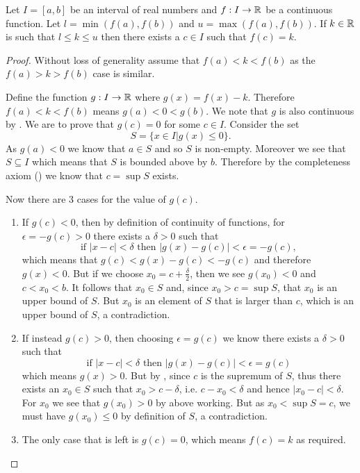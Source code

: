 \begin{theorem}\label{thrm-intermediate-value-theorem}
    Let $I = [a, b]$ be an interval of real numbers and $f: I \to \mathbb{R}$ be a continuous function. Let $l = \min(f(a), f(b))$ and $u = \max(f(a), f(b))$. If $k \in \mathbb{R}$ is such that $l \leq k \leq u$ then there exists a $c \in I$ such that $f(c) = k$.
\end{theorem}
\begin{proof}
    Without loss of generality assume that $f(a) < k < f(b)$ as the $f(a) > k > f(b)$ case is similar.

    Define the function $g: I \to \mathbb{R}$ where $g(x) = f(x) - k$. Therefore $f(a) < k < f(b)$ means $g(a) < 0 < g(b)$. We note that $g$ is also continuous by . We are to prove that $g(c) = 0$ for some $c \in I$. Consider the set
    \[
        S = \{x \in I \vert g(x) \leq 0\}.
    \]
    As $g(a) < 0$ we know that $a \in S$ and so $S$ is non-empty. Moreover we see that $S \subseteq I$ which means that $S$ is bounded above by $b$. Therefore by the completeness axiom () we know that $c = \sup S$ exists.

    Now there are 3 cases for the value of $g(c)$.
    \begin{enumerate}
        \item If $g(c) < 0$, then by definition of continuity of functions, for $\epsilon = -g(c) > 0$ there exists a $\delta > 0$ such that
        \[
            \text{if } |x - c| < \delta \text{ then } |g(x) - g(c)| < \epsilon = -g(c),
        \]
        which means that $g(c) < g(x) - g(c) < -g(c)$ and therefore $g(x) < 0$. But if we choose $x_0 = c + \frac\delta2$, then we see $g(x_0) < 0$ and $c < x_0 < b$. It follows that $x_0 \in S$ and, since $x_0 > c = \sup S$, that $x_0$ is an upper bound of $S$. But $x_0$ is an element of $S$ that is larger than $c$, which is an upper bound of $S$, a contradiction.

        \item If instead $g(c) > 0$, then choosing $\epsilon = g(c)$ we know there exists a $\delta > 0$ such that
        \[
            \text{if } |x - c| < \delta \text{ then } |g(x) - g(c)| < \epsilon = g(c)
        \]
        which means $g(x) > 0$. But by , since $c$ is the supremum of $S$, thus there exists an $x_0 \in S$ such that $x_0 > c - \delta$, i.e. $c - x_0 < \delta$ and hence $|x_0 - c| < \delta$. For $x_0$ we see that $g(x_0) > 0$ by above working. But as $x_0 < \sup S = c$, we must have $g(x_0) \leq 0$ by definition of $S$, a contradiction.

        \item The only case that is left is $g(c) = 0$, which means $f(c) = k$ as required.\qedhere
    \end{enumerate}
\end{proof}

